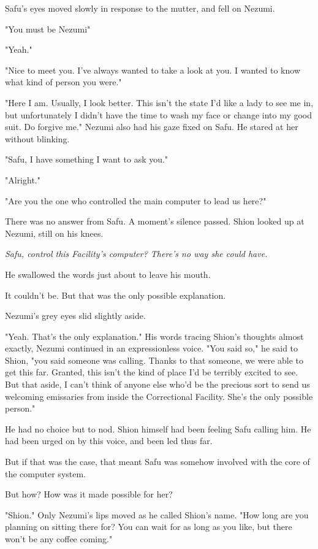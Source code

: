 Safu's eyes moved slowly in response to the mutter, and fell on Nezumi.

"You must be Nezumi\el "

"Yeah."

"Nice to meet you. I've always wanted to take a look at you. I wanted to
know what kind of person you were."

"Here I am. Usually, I look better. This isn't the state I'd like a lady
to see me in, but unfortunately I didn't have the time to wash my face
or change into my good suit. Do forgive me." Nezumi also had his gaze
fixed on Safu. He stared at her without blinking.

"Safu, I have something I want to ask you."

"\el Alright."

"Are you the one who controlled the main computer to lead us here?"

There was no answer from Safu. A moment's silence passed. Shion looked
up at Nezumi, still on his knees.

\emph{Safu, control this Facility's computer? There's no way she could have.}

He swallowed the words just about to leave his mouth.

It couldn't be. But that was the only possible explanation.

Nezumi's grey eyes slid slightly aside.

"Yeah. That's the only explanation." His words tracing Shion's thoughts
almost exactly, Nezumi continued in an expressionless voice. "You said
so," he said to Shion, "you said someone was calling. Thanks to that
someone, we were able to get this far. Granted, this isn't the kind of
place I'd be terribly excited to see. But that aside, I can't think of
anyone else who'd be the precious sort to send us welcoming emissaries
from inside the Correctional Facility. She's the only possible person."

He had no choice but to nod. Shion himself had been feeling Safu calling
him. He had been urged on by this voice, and been led thus far.

But if that was the case, that meant Safu was somehow involved with the
core of the computer system.

But how? How was it made possible for her?

"Shion." Only Nezumi's lips moved as he called Shion's name. "How long
are you planning on sitting there for? You can wait for as long as you
like, but there won't be any coffee coming."

